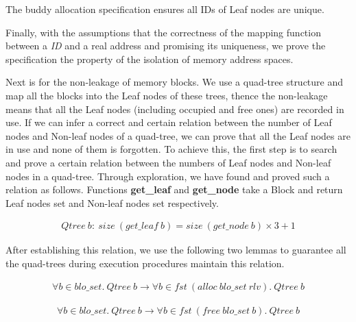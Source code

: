 \begin{theorem}
The buddy allocation specification ensures all IDs of Leaf nodes are unique.
\end{theorem}

Finally, with the assumptions that the correctness of the mapping function between a \emph{ID} and a real address and promising its uniqueness, we prove the specification the property of the isolation of memory address spaces.

Next is for the non-leakage of memory blocks. We use a quad-tree structure and map all the blocks into the Leaf nodes of these trees, thence the non-leakage means that all the Leaf nodes (including occupied and free ones) are recorded in use. If we can infer a correct and certain relation between the number of Leaf nodes and Non-leaf nodes of a quad-tree, we can prove that all the Leaf nodes are in use and none of them is forgotten. To achieve this, the first step is to search and prove a certain relation between the numbers of Leaf nodes and Non-leaf nodes in a quad-tree. Through exploration, we have found and proved such a relation as follows. Functions \textbf{get\_leaf} and \textbf{get\_node} take a Block and return Leaf nodes set and Non-leaf nodes set respectively.

\begin{lemma} 
\vspace{-7pt}
\end{lemma}
{\footnotesize
\begin{align*}
Qtree\ b:\ size\ (get\_leaf\ b) = size\ (get\_node\ b) \times 3 + 1
\end{align*}
}
\vspace{-12pt}

After establishing this relation, we use the following two lemmas to guarantee all the quad-trees during execution procedures maintain this relation.

\begin{lemma} 
\vspace{-7pt}
\end{lemma}
{\footnotesize
\begin{align*}
\forall b \in blo\_set.\ Qtree\ b \longrightarrow \forall b \in fst\ (alloc\ blo\_set\ rlv).\ Qtree\ b
\end{align*}
}
\vspace{-12pt}

\begin{lemma} 
\vspace{-7pt}
\end{lemma}
{\footnotesize
\begin{align*}
\forall b \in blo\_set.\ Qtree\ b \longrightarrow \forall b \in fst\ (free\ blo\_set\ b).\ Qtree\ b
\end{align*}
}
\vspace{-12pt}

